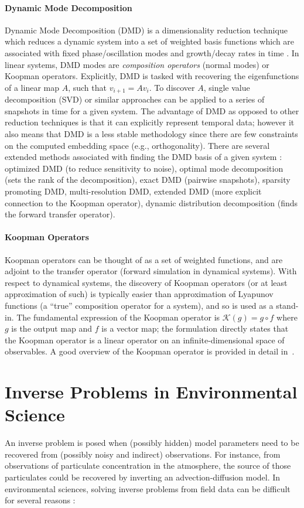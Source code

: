 \paragraph{Dynamic Mode Decomposition} Dynamic Mode Decomposition (DMD) is a dimensionality reduction technique which reduces a dynamic system into a set of weighted basis functions which are associated with fixed phase/oscillation modes and growth/decay rates in time \autocite{schmid2010dynamic}. In linear systems, DMD modes are \emph{composition operators} (normal modes) or Koopman operators. Explicitly, DMD is tasked with recovering the eigenfunctions of a linear map $A$, such that $v_{i+1} = A v_{i}$. To discover $A$, single value decomposition (SVD) or similar approaches can be applied to a series of snapshots in time for a given system. The advantage of DMD as opposed to other reduction techniques is that it can explicitly represent temporal data; however it also means that DMD is a less stable methodology since there are few constraints on the computed embedding space (e.g., orthogonality). There are several extended methods associated with finding the DMD basis of a given system \autocite{chen2012variants}: optimized DMD (to reduce sensitivity to noise), optimal mode decomposition (sets the rank of the decomposition), exact DMD (pairwise snapshots), sparsity promoting DMD, multi-resolution DMD, extended DMD (more explicit connection to the Koopman operator), dynamic distribution decomposition (finds the forward transfer operator).

\paragraph{Koopman Operators} Koopman operators can be thought of as a set of weighted functions, and are adjoint to the transfer operator (forward simulation in dynamical systems). With respect to dynamical systems, the discovery of Koopman operators (or at least approximation of such) is typically easier than approximation of Lyapunov functions (a ``true'' composition operator for a system), and so is used as a stand-in. The fundamental expression of the Koopman operator is $\mathcal{K}(g) = g \circ f$ where $g$ is the output map and $f$ is a vector map; the formulation directly states that the Koopman operator is a linear operator on an infinite-dimensional space of observables. A good overview of the Koopman operator is provided in detail in~\cite{bruce2019koopman}.


\section{Inverse Problems in Environmental Science}
\label{sec:measure_and_model}
An inverse problem is posed when (possibly hidden) model parameters need to be recovered from (possibly noisy and indirect) observations.
For instance, from observations of particulate concentration in the atmosphere, the source of those particulates could be recovered by inverting an advection-diffusion model.
In environmental sciences, solving inverse problems from field data can be difficult for several reasons \autocite{arridge2019solving}: 

